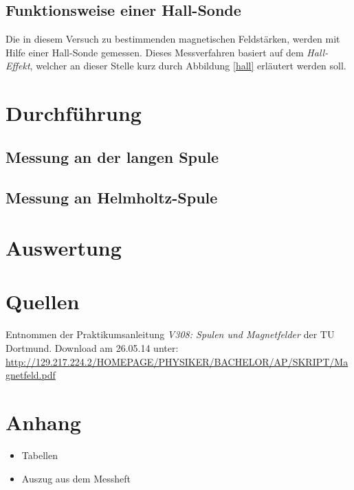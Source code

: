 \documentclass[11pt,ngerman,a4paper]{article}
\begin{document}
\subsection{Funktionsweise einer Hall-Sonde}
Die in diesem Versuch zu bestimmenden magnetischen Feldstärken, werden mit Hilfe einer Hall-Sonde gemessen. Dieses Messverfahren basiert auf dem \textit{Hall-Effekt}, welcher an dieser Stelle kurz durch Abbildung \ref{hall} erläutert werden soll.  
\section{Durchführung}
\subsection{Messung an der langen Spule}




\subsection{Messung an Helmholtz-Spule}


\section{Auswertung}

\section{Quellen}
\begin{enumerate}[{[}1{]}]
\item Entnommen der Praktikumsanleitung \textit{V308: Spulen und Magnetfelder} der TU Dortmund. Download am 26.05.14 unter:\\
 \url{http://129.217.224.2/HOMEPAGE/PHYSIKER/BACHELOR/AP/SKRIPT/Magnetfeld.pdf}
\end{enumerate}

\section{Anhang}
\begin{itemize}
\item Tabellen
\item Auszug aus dem Messheft
\end{itemize}
\end{document}
